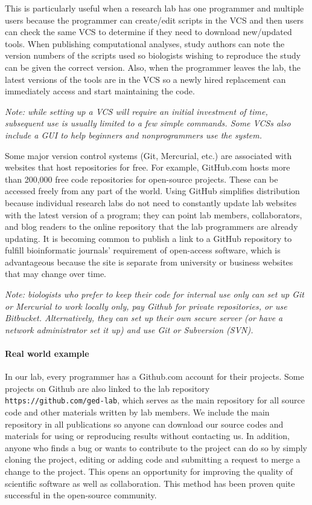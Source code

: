 \documentclass[ChapterTOCs,krantz2]{krantz} %
\begin{document}
This is particularly useful when a research lab has one programmer 
and multiple users because the programmer can create/edit scripts in
the VCS and then users can check the same VCS to determine if they need to
download new/updated tools.  When publishing 
computational analyses, study
authors can note the version numbers of the scripts used so biologists
wishing to reproduce the study can be given the correct version.
Also, when the programmer leaves the lab, the latest versions of the
tools are in the VCS so a newly hired replacement can immediately
access and start maintaining the code.

\textsl{Note: while setting up a VCS will require an initial investment of time, 
subsequent use is usually limited to a few simple commands.  Some VCSs
also include a GUI to help beginners and nonprogrammers use the system.}

Some major version control systems (Git, Mercurial, etc.) are associated with websites 
that host repositories for free.  For example, GitHub.com hosts more than 200,000 free code
repositories for open-source projects. These can be accessed
freely from any part of the world.  Using GitHub
simplifies distribution because individual research labs do not need to
constantly update lab websites with the latest version of a program;
they can point lab members, collaborators, and blog readers to the online
repository that the lab programmers are already updating.  It is becoming 
common to publish a link to a GitHub repository to
fulfill bioinformatic journals' requirement of open-access software, 
which is advantageous because the site is separate from
university or business websites that may change over time.  

\textsl{Note: biologists who prefer to keep their
code for internal use only can set up Git or Mercurial to work 
locally only, pay Github for private repositories, or use Bitbucket.  
Alternatively, they can set up their own secure
server (or have a network administrator set it up) and use
Git or Subversion (SVN).}

\paragraph{Real world example}

In our lab, every programmer has a Github.com account for their projects.
Some
projects on Github are also linked to the lab repository
\texttt{https://github.com/ged-lab}, which serves as the main repository for
all source code and other materials written by lab members. 
We include the main repository in all
publications so anyone can download our source codes and materials
for using or reproducing results without contacting us. 
In addition, anyone who finds a bug or wants to contribute to
the project can do so by simply cloning the project, editing or adding code
and submitting a request to merge a change to the project.
This opens an opportunity for improving the quality of scientific software
as well as collaboration.
This method has been proven quite successful in the open-source community.
\end{document}
